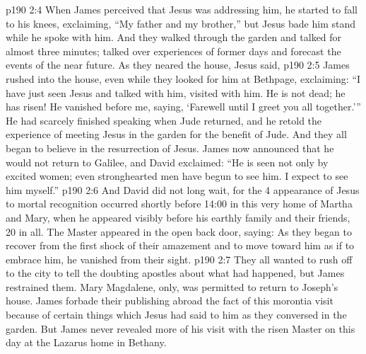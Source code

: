 \vs p190 2:4 When James perceived that Jesus was addressing him, he started to fall to his knees, exclaiming, “My father and my brother,” but Jesus bade him stand while he spoke with him. And they walked through the garden and talked for almost three minutes; talked over experiences of former days and forecast the events of the near future. As they neared the house, Jesus said, 
\vs p190 2:5 James rushed into the house, even while they looked for him at Bethpage, exclaiming: “I have just seen Jesus and talked with him, visited with him. He is not dead; he has risen! He vanished before me, saying, ‘Farewell until I greet you all together.’” He had scarcely finished speaking when Jude returned, and he retold the experience of meeting Jesus in the garden for the benefit of Jude. And they all began to believe in the resurrection of Jesus. James now announced that he would not return to Galilee, and David exclaimed: “He is seen not only by excited women; even stronghearted men have begun to see him. I expect to see him myself.”
\vs p190 2:6 \pc And David did not long wait, for the 4 appearance of Jesus to mortal recognition occurred shortly before 14:00 in this very home of Martha and Mary, when he appeared visibly before his earthly family and their friends, 20 in all. The Master appeared in the open back door, saying:  As they began to recover from the first shock of their amazement and to move toward him as if to embrace him, he vanished from their sight.
\vs p190 2:7 \pc They all wanted to rush off to the city to tell the doubting apostles about what had happened, but James restrained them. Mary Magdalene, only, was permitted to return to Joseph’s house. James forbade their publishing abroad the fact of this morontia visit because of certain things which Jesus had said to him as they conversed in the garden. But James never revealed more of his visit with the risen Master on this day at the Lazarus home in Bethany.
